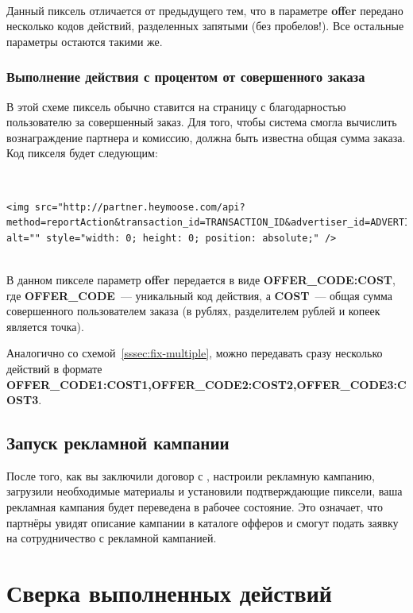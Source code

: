 \documentclass[a4paper,12pt]{article}
\begin{document}
~\\

Данный пиксель отличается от предыдущего тем, что в параметре \textbf{offer} передано несколько кодов действий, разделенных запятыми (без пробелов!). Все остальные параметры остаются такими же.

\subsubsection{Выполнение действия с процентом от совершенного заказа}

В этой схеме пиксель обычно ставится на страницу с благодарностью пользователю за совершенный заказ. Для того, чтобы система \heymoose{} смогла вычислить вознаграждение партнера и комиссию, должна быть известна общая сумма заказа. Код пикселя будет следующим:

~\\

\begin{lstlisting}[language=Pixel]
<img src="http://partner.heymoose.com/api?method=reportAction&transaction_id=TRANSACTION_ID&advertiser_id=ADVERTISER_ID&offer=OFFER_CODE:COST" 
alt="" style="width: 0; height: 0; position: absolute;" />
\end{lstlisting}

~\\

В данном пикселе параметр \textbf{offer} передается в виде \textbf{OFFER\_CODE:COST}, где \textbf{OFFER\_CODE}~--- уникальный код действия, а \textbf{COST}~--- общая сумма совершенного пользователем заказа (в рублях, разделителем рублей и копеек является точка).

Аналогично со схемой~\ref{sssec:fix-multiple}, можно передавать сразу несколько действий в формате \textbf{OFFER\_CODE1:COST1,OFFER\_CODE2:COST2,OFFER\_CODE3:COST3}.

\subsection{Запуск рекламной кампании}

После того, как вы заключили договор с \heymoose{}, настроили рекламную кампанию, загрузили необходимые материалы и установили подтверждающие пиксели, ваша рекламная кампания будет переведена в рабочее состояние. Это означает, что партнёры увидят описание кампании в каталоге офферов и смогут подать заявку на сотрудничество с рекламной кампанией.


\section{Сверка выполненных действий}
\end{document}
